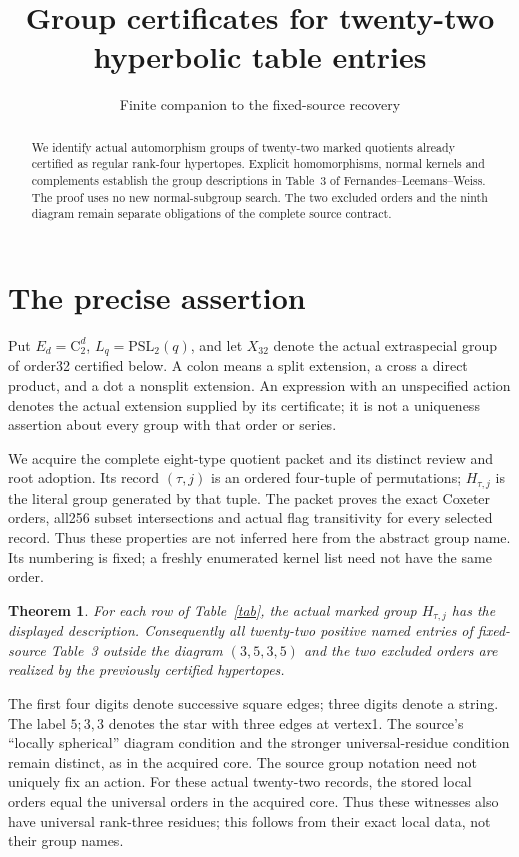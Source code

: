 \documentclass[11pt]{article}
\title{Group certificates for twenty-two hyperbolic table entries}
\author{Finite companion to the fixed-source recovery}\date{}
\newtheorem{theorem}{Theorem}\newtheorem{lemma}{Lemma}
\newcommand{\C}{\mathrm C}\newcommand{\A}{\mathrm A}\newcommand{\Sym}{\mathrm S}\newcommand{\PSL}{\mathrm{PSL}}
\begin{document}
\maketitle
\begin{abstract}
We identify actual automorphism groups of twenty-two marked quotients already
certified as regular rank-four hypertopes. Explicit homomorphisms, normal
kernels and complements establish the group descriptions in Table~3 of
Fernandes--Leemans--Weiss. The proof uses no new normal-subgroup search.
The two excluded orders and the ninth diagram remain separate obligations
of the complete source contract.
\end{abstract}
\section{The precise assertion}
Put $E_d=\C_2^d$, $L_q=\PSL_2(q)$, and let $X_{32}$ denote the actual
extraspecial group of order32 certified below. A colon means a split
extension, a cross a direct product, and a dot a nonsplit extension.
An expression with an unspecified action denotes the actual extension
supplied by its certificate; it is not a uniqueness assertion about every
group with that order or series.

We acquire the complete eight-type quotient packet and its distinct review
and root adoption. Its record $(\tau,j)$ is an ordered four-tuple of
permutations; $H_{\tau,j}$ is the literal group generated by that tuple.
The packet proves the exact Coxeter orders, all256 subset intersections and
actual flag transitivity for every selected record. Thus these properties
are not inferred here from the abstract group name. Its numbering is fixed;
a freshly enumerated kernel list need not have the same order.

\begin{theorem}
For each row of Table~\ref{tab}, the actual marked group $H_{\tau,j}$ has the
displayed description. Consequently all twenty-two positive named entries
of fixed-source Table~3 outside the diagram $(3,5,3,5)$ and the two excluded
orders are realized by the previously certified hypertopes.
\end{theorem}
The first four digits denote successive square edges; three digits denote
a string. The label $5;3,3$ denotes the star with three edges at vertex1.
The source's ``locally spherical'' diagram condition and the stronger
universal-residue condition remain distinct, as in the acquired core.
The source group notation need not uniquely fix an action. For these actual
twenty-two records, the stored local orders equal the universal orders in
the acquired core. Thus these witnesses also have universal rank-three
residues; this follows from their exact local data, not their group names.
\end{document}
